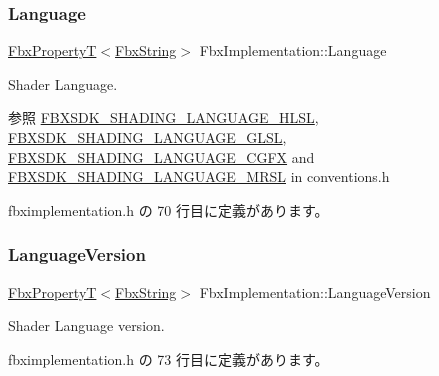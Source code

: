 \subsubsection{\texorpdfstring{Language}{Language}}
{\footnotesize\ttfamily \hyperlink{class_fbx_property_t}{Fbx\+PropertyT}$<$\hyperlink{class_fbx_string}{Fbx\+String}$>$ Fbx\+Implementation\+::\+Language}

Shader Language. \begin{DoxySeeAlso}{参照}
\hyperlink{fbxshadingconventions_8h_ac10b54a713e5562fe6572d1a2594288f}{F\+B\+X\+S\+D\+K\+\_\+\+S\+H\+A\+D\+I\+N\+G\+\_\+\+L\+A\+N\+G\+U\+A\+G\+E\+\_\+\+H\+L\+SL}, \hyperlink{fbxshadingconventions_8h_a52222f21db3187bf9ed4986f053aa44f}{F\+B\+X\+S\+D\+K\+\_\+\+S\+H\+A\+D\+I\+N\+G\+\_\+\+L\+A\+N\+G\+U\+A\+G\+E\+\_\+\+G\+L\+SL}, \hyperlink{fbxshadingconventions_8h_a0551f4268e3fc2e0fcd9464297b31b6f}{F\+B\+X\+S\+D\+K\+\_\+\+S\+H\+A\+D\+I\+N\+G\+\_\+\+L\+A\+N\+G\+U\+A\+G\+E\+\_\+\+C\+G\+FX} and \hyperlink{fbxshadingconventions_8h_a7941affa96f6fc8d3345dac506c71ea2}{F\+B\+X\+S\+D\+K\+\_\+\+S\+H\+A\+D\+I\+N\+G\+\_\+\+L\+A\+N\+G\+U\+A\+G\+E\+\_\+\+M\+R\+SL} in conventions.\+h 
\end{DoxySeeAlso}


 fbximplementation.\+h の 70 行目に定義があります。

\mbox{\label{class_fbx_implementation_aebb544e23225701b6e92cd058bc09bab}} 
\subsubsection{\texorpdfstring{Language\+Version}{LanguageVersion}}
{\footnotesize\ttfamily \hyperlink{class_fbx_property_t}{Fbx\+PropertyT}$<$\hyperlink{class_fbx_string}{Fbx\+String}$>$ Fbx\+Implementation\+::\+Language\+Version}



Shader Language version. 



 fbximplementation.\+h の 73 行目に定義があります。

\mbox{\label{class_fbx_implementation_ac127174c10e30bdf28d2e276c7818302}} 
